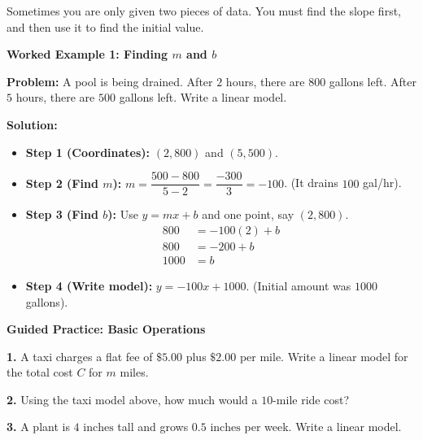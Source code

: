 \documentclass[12pt, letterpaper, fleqn]{article}
\begin{document}
\noindent
Sometimes you are only given two pieces of data. You must find the slope first, and then use it to find the initial value.

\vspace{3mm}

\begin{tcolorbox}[colback=white, colframe=black!25, boxrule=0.6pt, arc=4mm, left=6mm, right=6mm, top=5mm, bottom=5mm]

\textbf{Worked Example 1: Finding $m$ and $b$}

\medskip

\textbf{Problem:} A pool is being drained. After $2$ hours, there are $800$ gallons left. After $5$ hours, there are $500$ gallons left. Write a linear model.

\medskip

\textbf{Solution:}
\begin{itemize}
    \item \textbf{Step 1 (Coordinates):} $(2, 800)$ and $(5, 500)$.
    \item \textbf{Step 2 (Find $m$):} $m = \dfrac{500 - 800}{5 - 2} = \dfrac{-300}{3} = -100$. (It drains $100$ gal/hr).
    \item \textbf{Step 3 (Find $b$):} Use $y = mx + b$ and one point, say $(2, 800)$.
    \begin{align*}
        800 &= -100(2) + b \\
        800 &= -200 + b \\
        1000 &= b
    \end{align*}
    \item \textbf{Step 4 (Write model):} $y = -100x + 1000$. (Initial amount was $1000$ gallons).
\end{itemize}

\end{tcolorbox}

\vspace{4mm}

\begin{tcolorbox}[colback=white!15, colframe=black, boxrule=1.5pt, arc=4mm, left=6mm, right=6mm, top=5mm, bottom=5mm]

\textbf{Guided Practice: Basic Operations}

\medskip

\noindent
\textbf{1.} A taxi charges a flat fee of $\$5.00$ plus $\$2.00$ per mile. Write a linear model for the total cost $C$ for $m$ miles.
\vspace{1.5cm}

\noindent
\textbf{2.} Using the taxi model above, how much would a $10$-mile ride cost?
\vspace{1.5cm}

\noindent
\textbf{3.} A plant is $4\text{ inches}$ tall and grows $0.5\text{ inches}$ per week. Write a linear model.
\vspace{1.5cm}

\end{tcolorbox}
\end{document}
